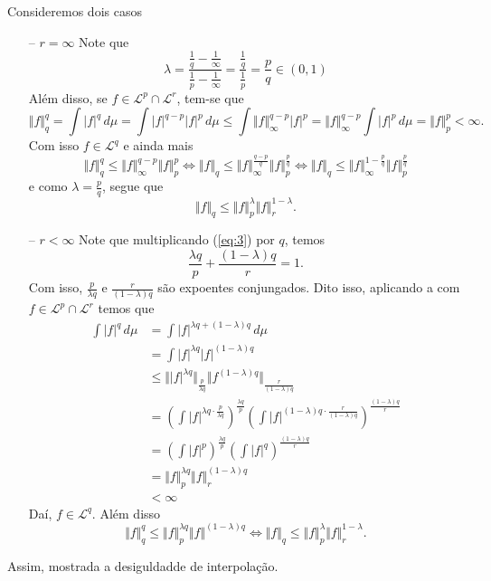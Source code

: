 \documentclass[a4paper, 11pt]{book}
\theoremstyle{definition}
\newcommand{\cL}{\mathcal{L}}
\begin{document}
\begin{prf}
    Consideremos dois casos
    \begin{itemize}[leftmargin=*]
        \item[--] $r = \infty$
        Note que
        \[
            \lambda = \frac{\frac{1}{q} - \frac{1}{\infty}}{\frac{1}{p} - \frac{1}{\infty}} = \frac{\frac{1}{q}}{\frac{1}{p}} = \frac{p}{q} \in (0,1)
        \]
        Além disso, se $f \in \cL^p \cap \cL^r$, tem-se que
        \[
            \Vert f \Vert_q^q =  \int \vert f \vert^q \, d\mu = \int |f|^{q-p} |f|^p \, d\mu \leqslant \int \Vert f \Vert_\infty^{q-p} |f|^p = \Vert f \Vert_\infty^{q-p} \int |f|^p \,d\mu = \Vert f \Vert_p^p <\infty.
        \]
        Com isso $f \in \cL^q$ e ainda mais
        \[
            \Vert f \Vert^q_q \leqslant \Vert f \Vert_\infty^{q-p} \Vert f \Vert_p^p \iff \Vert f \Vert_q \leqslant \Vert f \Vert_\infty^{\frac{q-p}{q}} \Vert f \Vert_p^{\frac{p}{q}} \iff \Vert f \Vert_q \leqslant \Vert f \Vert_\infty^{1 - \frac{p}{q}} \Vert f \Vert_p^{\frac{p}{q}}
        \]
        e como $\lambda = \frac{p}{q}$, segue que
        \[
            \Vert f \Vert_q \leqslant \Vert f \Vert_p^\lambda \Vert f \Vert_r^{1 - \lambda}.
        \]
        \item[--] $r < \infty$
        Note que multiplicando (\ref{eq:3}) por $q$, temos
        \[
            \frac{\lambda q}{p} + \frac{(1-\lambda)q}{r} = 1.
        \]
        Com isso, $\frac{p}{\lambda q}$ e $\frac{r}{(1-\lambda)q}$ são expoentes conjungados. Dito isso, aplicando a  com $f \in \cL^p \cap \cL^r$ temos que
        \[
            \begin{aligned}
                \int |f|^q \, d\mu &= \int |f|^{\lambda q + (1-\lambda)q} \,d\mu \\
                &= \int |f|^{\lambda q} |f|^{(1-\lambda)q}\\
                &\leqslant \Vert |f|^{\lambda q} \Vert_{\frac{p}{\lambda q}} \Vert f^{(1-\lambda)q} \Vert_{\frac{r}{(1-\lambda)q}}\\
                &= \left( \int |f|^{\lambda q \cdot \frac{p}{\lambda q}} \right)^{\frac{\lambda q}{p}} \left( \int |f|^{(1 - \lambda) q \cdot \frac{r}{(1-\lambda)q}} \right)^{\frac{(1-\lambda)q}{r}}\\
                &= \left( \int |f|^{p} \right)^{\frac{\lambda q}{p}} \left( \int |f|^{q} \right)^{\frac{(1-\lambda)q}{r}}\\
                &= \Vert f \Vert_p^{\lambda q} \Vert f \Vert^{(1-\lambda)q}_r\\
                &< \infty
            \end{aligned}
        \]
        Daí, $f \in \cL^q$. Além disso
        \[
            \Vert f \Vert_q^q \leqslant \Vert f \Vert_p^{\lambda q} \Vert f \Vert^{(1-\lambda)q} \iff \Vert f \Vert_q \leqslant \Vert f \Vert_p^\lambda \Vert f \Vert_r^{1 - \lambda}.
        \]
    \end{itemize}
    Assim, mostrada a desiguldadde de interpolação. 
\end{prf}
\end{document}
